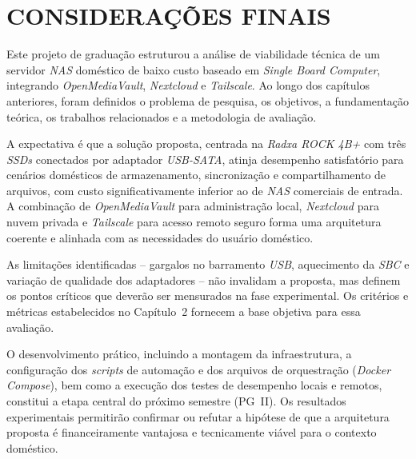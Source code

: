 
\chapter{CONSIDERAÇÕES FINAIS}

Este projeto de graduação estruturou a análise de viabilidade técnica de um servidor \textit{NAS} doméstico de baixo custo baseado em \textit{Single Board Computer}, integrando \textit{OpenMediaVault}, \textit{Nextcloud} e \textit{Tailscale}. Ao longo dos capítulos anteriores, foram definidos o problema de pesquisa, os objetivos, a fundamentação teórica, os trabalhos relacionados e a metodologia de avaliação.

A expectativa é que a solução proposta, centrada na \textit{Radxa ROCK 4B+} com três \textit{SSDs} conectados por adaptador \textit{USB-SATA}, atinja desempenho satisfatório para cenários domésticos de armazenamento, sincronização e compartilhamento de arquivos, com custo significativamente inferior ao de \textit{NAS} comerciais de entrada. A combinação de \textit{OpenMediaVault} para administração local, \textit{Nextcloud} para nuvem privada e \textit{Tailscale} para acesso remoto seguro forma uma arquitetura coerente e alinhada com as necessidades do usuário doméstico.

As limitações identificadas -- gargalos no barramento \textit{USB}, aquecimento da \textit{SBC} e variação de qualidade dos adaptadores -- não invalidam a proposta, mas definem os pontos críticos que deverão ser mensurados na fase experimental. Os critérios e métricas estabelecidos no Capítulo~2 fornecem a base objetiva para essa avaliação.

O desenvolvimento prático, incluindo a montagem da infraestrutura, a configuração dos \textit{scripts} de automação e dos arquivos de orquestração (\textit{Docker Compose}), bem como a execução dos testes de desempenho locais e remotos, constitui a etapa central do próximo semestre (PG~II). Os resultados experimentais permitirão confirmar ou refutar a hipótese de que a arquitetura proposta é financeiramente vantajosa e tecnicamente viável para o contexto doméstico.
\endinput
